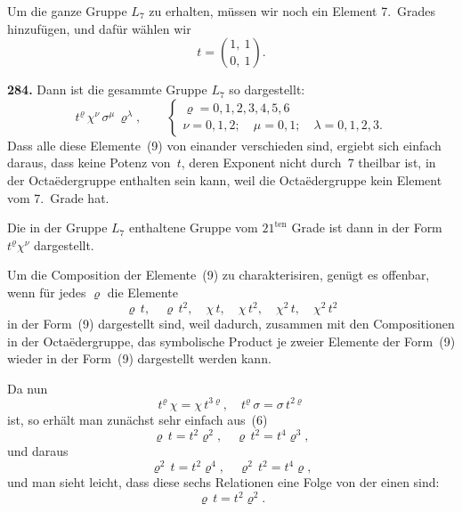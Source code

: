 \documentclass[12pt,a4paper]{article}
\begin{document}
Um die ganze Gruppe $L_7$ zu erhalten, m\"ussen wir noch ein Element 7.~Grades hinzuf\"ugen, und daf\"ur w\"ahlen wir
\[
t = \binom{1,\ 1}{0,\ 1}.
\]

\bigskip
\noindent\textbf{284.} Dann ist die gesammte Gruppe $L_7$ so dargestellt:
\begin{equation}
\tag{9}
t^{\varrho}\,\chi^{\nu}\,\sigma^{\mu}\,\varrho^{\lambda},\qquad
\begin{cases}
\varrho = 0,1,2,3,4,5,6\\
\nu = 0,1,2;\quad \mu = 0,1;\quad \lambda = 0,1,2,3.
\end{cases}
\end{equation}
Dass alle diese Elemente~(9) von einander verschieden sind, ergiebt sich einfach daraus, dass keine Potenz von~$t$, deren Exponent nicht durch~7 theilbar ist, in der Octa\"edergruppe enthalten sein kann, weil die Octa\"edergruppe kein Element vom 7.~Grade hat.

Die in der Gruppe $L_7$ enthaltene Gruppe vom $21^{\text{ten}}$ Grade ist dann in der Form $t^{\varrho}\chi^{\nu}$ dargestellt.

Um die Composition der Elemente~(9) zu charakterisiren, gen\"ugt es offenbar, wenn f\"ur jedes $\varrho$ die Elemente
\begin{equation}
\tag{10}
\varrho\,t,\quad \varrho\,t^2,\quad \chi\,t,\quad \chi\,t^2,\quad \chi^2\,t,\quad \chi^2\,t^2
\end{equation}
in der Form~(9) dargestellt sind, weil dadurch, zusammen mit den Compositionen in der Octa\"edergruppe, das symbolische Product je zweier Elemente der Form~(9) wieder in der Form~(9) dargestellt werden kann.

Da nun
\begin{equation}
\tag{11}
t^{\varrho}\,\chi = \chi\,t^{3\varrho},\quad t^{\varrho}\,\sigma = \sigma\,t^{2\varrho}
\end{equation}
ist, so erh\"alt man zun\"achst sehr einfach aus~(6)
\begin{equation}
\tag{12}
\varrho\,t = t^2\varrho^2,\quad \varrho\,t^2 = t^4\varrho^3,
\end{equation}
und daraus
\begin{equation}
\tag{13}
\varrho^2\,t = t^2\varrho^4,\quad \varrho^2\,t^2 = t^4\varrho,
\end{equation}
und man sieht leicht, dass diese sechs Relationen eine Folge von der einen sind:
\begin{equation}
\tag{14}
\varrho\,t = t^2\varrho^2.
\end{equation}
\end{document}
